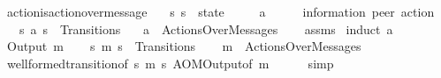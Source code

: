 \begin{isabellebody}
\endisatagproof
{\isafoldproof}%
%
\isadelimproof
\isanewline
%
\endisadelimproof
\isanewline
{}\isamarkupfalse%
\ action{\isacharunderscore}{\kern0pt}is{\isacharunderscore}{\kern0pt}action{\isacharunderscore}{\kern0pt}over{\isacharunderscore}{\kern0pt}message{\isacharcolon}{\kern0pt}\isanewline
\ \ \ s{}\ s{}\ {\isacharcolon}{\kern0pt}{\isacharcolon}{\kern0pt}\ {\isachardoublequoteopen}{\isacharprime}{\kern0pt}state{\isachardoublequoteclose}\isanewline
\ \ \ \ \ a\ \ \ \ \ {\isacharcolon}{\kern0pt}{\isacharcolon}{\kern0pt}\ {\isachardoublequoteopen}{\isacharparenleft}{\kern0pt}{\isacharprime}{\kern0pt}information{\isacharcomma}{\kern0pt}\ {\isacharprime}{\kern0pt}peer{\isacharparenright}{\kern0pt}\ action{\isachardoublequoteclose}\isanewline
\ \ \ {\isachardoublequoteopen}{\isacharparenleft}{\kern0pt}s{}{\isacharcomma}{\kern0pt}\ a{\isacharcomma}{\kern0pt}\ s{}{\isacharparenright}{\kern0pt}\ {\isasymin}\ Transitions{\isachardoublequoteclose}\isanewline
\ \ \ {\isachardoublequoteopen}a\ {\isasymin}\ ActionsOverMessages{\isachardoublequoteclose}\isanewline
%
\isadelimproof
\ \ %
\endisadelimproof
%
\isatagproof
{}\isamarkupfalse%
\ assms\isanewline
{}\isamarkupfalse%
\ {\isacharparenleft}{\kern0pt}induct\ a{\isacharparenright}{\kern0pt}\isanewline
\ \ \isamarkupfalse%
\ {\isacharparenleft}{\kern0pt}Output\ m{\isacharparenright}{\kern0pt}\isanewline
\ \ \isamarkupfalse%
\ {\isachardoublequoteopen}{\isacharparenleft}{\kern0pt}s{}{\isacharcomma}{\kern0pt}\ {\isacharbang}{\kern0pt}{\isasymlangle}m{\isasymrangle}{\isacharcomma}{\kern0pt}\ s{}{\isacharparenright}{\kern0pt}\ {\isasymin}\ Transitions{\isachardoublequoteclose}\isanewline
\ \ \isamarkupfalse%
\ {\isachardoublequoteopen}{\isacharbang}{\kern0pt}{\isasymlangle}m{\isasymrangle}\ {\isasymin}\ ActionsOverMessages{\isachardoublequoteclose}\isanewline
\ \ \ \ \isamarkupfalse%
\ well{\isacharunderscore}{\kern0pt}formed{\isacharunderscore}{\kern0pt}transition{\isacharbrackleft}{\kern0pt}of\ s{}\ {\isachardoublequoteopen}{\isacharbang}{\kern0pt}{\isasymlangle}m{\isasymrangle}{\isachardoublequoteclose}\ s{}{\isacharbrackright}{\kern0pt}\ AOMOutput{\isacharbrackleft}{\kern0pt}of\ m{\isacharbrackright}{\kern0pt}\isanewline
\ \ \ \ \isamarkupfalse%
\ simp\isanewline
{}\isamarkupfalse%

\end{isabellebody}
